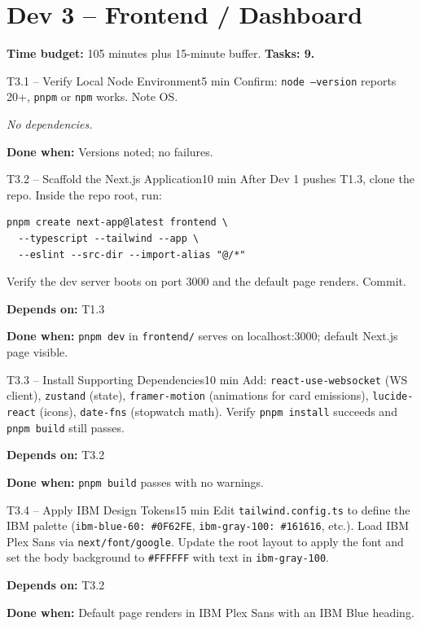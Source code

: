 \documentclass[11pt,letterpaper]{article}
\newcommand{\acceptance}[1]{\par\smallskip\textcolor{ibmgreen}{\textbf{Done when:}} #1}
\newcommand{\depends}[1]{\par\smallskip\textcolor{ibmorange}{\textbf{Depends on:}} #1}
\newcommand{\nodep}{\par\smallskip\textcolor{ibmgray}{\textit{No dependencies.}}}
\begin{document}
\section{Dev 3 -- Frontend / Dashboard}

\textbf{Time budget:} 105 minutes plus 15-minute buffer. \textbf{Tasks: 9.}

\begin{task}{T3.1 -- Verify Local Node Environment}{5 min}
Confirm: \texttt{node --version} reports 20+, \texttt{pnpm} or \texttt{npm} works. Note OS.
\nodep
\acceptance{Versions noted; no failures.}
\end{task}

\begin{task}{T3.2 -- Scaffold the Next.js Application}{10 min}
After Dev 1 pushes T1.3, clone the repo. Inside the repo root, run:

\begin{lstlisting}
pnpm create next-app@latest frontend \
  --typescript --tailwind --app \
  --eslint --src-dir --import-alias "@/*"
\end{lstlisting}

Verify the dev server boots on port 3000 and the default page renders. Commit.
\depends{T1.3}
\acceptance{\texttt{pnpm dev} in \texttt{frontend/} serves on localhost:3000; default Next.js page visible.}
\end{task}

\begin{task}{T3.3 -- Install Supporting Dependencies}{10 min}
Add: \texttt{react-use-websocket} (WS client), \texttt{zustand} (state), \texttt{framer-motion} (animations for card emissions), \texttt{lucide-react} (icons), \texttt{date-fns} (stopwatch math). Verify \texttt{pnpm install} succeeds and \texttt{pnpm build} still passes.
\depends{T3.2}
\acceptance{\texttt{pnpm build} passes with no warnings.}
\end{task}

\begin{task}{T3.4 -- Apply IBM Design Tokens}{15 min}
Edit \texttt{tailwind.config.ts} to define the IBM palette (\texttt{ibm-blue-60: \#0F62FE}, \texttt{ibm-gray-100: \#161616}, etc.). Load IBM Plex Sans via \texttt{next/font/google}. Update the root layout to apply the font and set the body background to \texttt{\#FFFFFF} with text in \texttt{ibm-gray-100}.
\depends{T3.2}
\acceptance{Default page renders in IBM Plex Sans with an IBM Blue heading.}
\end{task}
\end{document}
